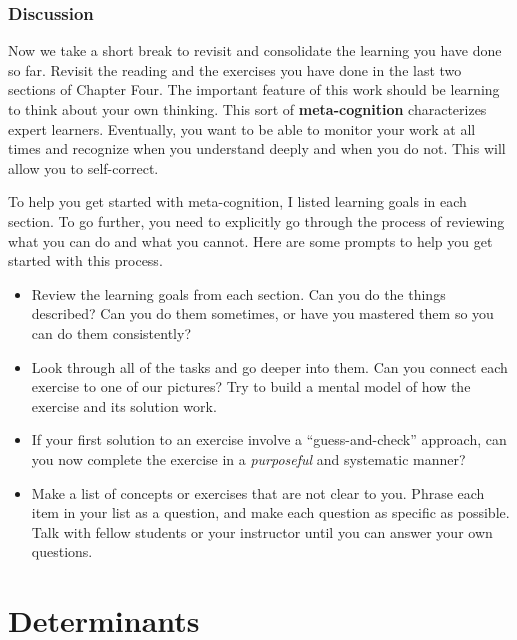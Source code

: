 \documentclass[10pt,]{book}
\newcommand{\terminology}[1]{\textbf{#1}}
\theoremstyle{plain}
\theoremstyle{definition}
\numberwithin{equation}{section}
\begin{document}
\subsection[Discussion]{Discussion}\label{subsection-114}
Now we take a short break to revisit and consolidate the learning you
      have done so far. Revisit the reading and the exercises you have done in
      the last two sections of Chapter Four. The important feature of this work should be
      learning to think about your own thinking. This sort of \terminology{meta-cognition}
      characterizes expert learners. Eventually, you want to be able to monitor
      your work at all times and recognize when you understand deeply and when
      you do not. This will allow you to self-correct.
\par
To help you get started with meta-cognition, I listed learning goals in
      each section. To go further, you need to explicitly go through the process
      of reviewing what you can do and what you cannot. Here are some prompts to
      help you get started with this process.
      \begin{itemize}
\item{}
          Review the learning goals from each section. Can you do the things
          described? Can you do them sometimes, or have you mastered them so you
          can do them consistently?
        \item{}
          Look through all of the tasks and go deeper into them. Can you
          connect each exercise to one of our pictures? Try to build a mental
          model of how the exercise and its solution work.
        \item{}
          If your first solution to an exercise involve a ``guess-and-check''
          approach, can you now complete the exercise in a \emph{purposeful}
          and systematic manner?
        \item{}
          Make a list of concepts or exercises that are not clear to you. Phrase
          each item in your list as a question, and make each question as
          specific as possible. Talk with fellow students or your
          instructor until you can answer your own questions.
        \end{itemize}

\clearpage
\typeout{************************************************}
\typeout{************************************************}
\chapter[Determinants]{Determinants}\label{chapter-determinants}
\end{document}
